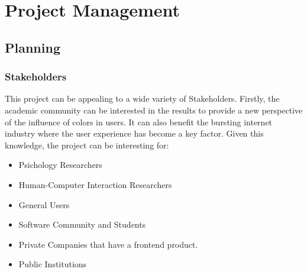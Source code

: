 \chapter{Project Management}
\label{app:project_management}
\section{Planning}
\subsection{Stakeholders}
This project can be appealing to a wide variety of Stakeholders. Firstly, the academic community
can be interested in the results to provide a new perspective of the influence of colors in users. 
It can also benefit the bursting internet industry where the user experience has become a key factor.
Given this knowledge, the project can be interesting for:
\begin{itemize}
    \item Psichology Researchers
    \item Human-Computer Interaction Researchers
    \item General Users
    \item Software Community and Students
    \item Private Companies that have a frontend product.
    \item Public Institutions 
\end{itemize}

